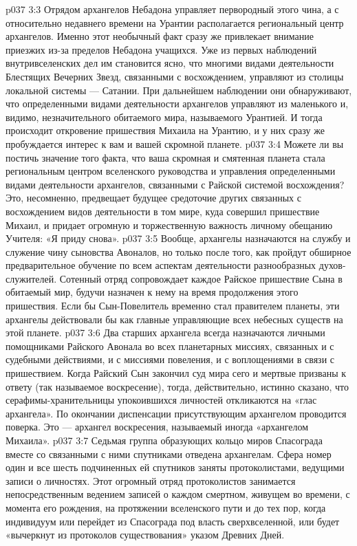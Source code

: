 \vs p037 3:3 \pc Отрядом архангелов Небадона управляет первородный этого чина, а с относительно недавнего времени на Урантии располагается региональный центр архангелов. Именно этот необычный факт сразу же привлекает внимание приезжих из\hyp{}за пределов Небадона учащихся. Уже из первых наблюдений внутривселенских дел им становится ясно, что многими видами деятельности Блестящих Вечерних Звезд, связанными с восхождением, управляют из столицы локальной системы --- Сатании. При дальнейшем наблюдении они обнаруживают, что определенными видами деятельности архангелов управляют из маленького и, видимо, незначительного обитаемого мира, называемого Урантией. И тогда происходит откровение пришествия Михаила на Урантию, и у них сразу же пробуждается интерес к вам и вашей скромной планете.
\vs p037 3:4 Можете ли вы постичь значение того факта, что ваша скромная и смятенная планета стала региональным центром вселенского руководства и управления определенными видами деятельности архангелов, связанными с Райской системой восхождения? Это, несомненно, предвещает будущее средоточие других связанных с восхождением видов деятельности в том мире, куда совершил пришествие Михаил, и придает огромную и торжественную важность личному обещанию Учителя: «Я приду снова».
\vs p037 3:5 \pc Вообще, архангелы назначаются на службу и служение чину сыновства Авоналов, но только после того, как пройдут обширное предварительное обучение по всем аспектам деятельности разнообразных духов\hyp{}служителей. Сотенный отряд сопровождает каждое Райское пришествие Сына в обитаемый мир, будучи назначен к нему на время продолжения этого пришествия. Если бы Сын\hyp{}Повелитель временно стал правителем планеты, эти архангелы действовали бы как главные управляющие всех небесных существ на этой планете.
\vs p037 3:6 Два старших архангела всегда назначаются личными помощниками Райского Авонала во всех планетарных миссиях, связанных и с судебными действиями, и с миссиями повеления, и с воплощениями в связи с пришествием. Когда Райский Сын закончил суд мира сего и мертвые призваны к ответу (так называемое воскресение), тогда, действительно, истинно сказано, что серафимы\hyp{}хранительницы упокоившихся личностей откликаются на «глас архангела». По окончании диспенсации присутствующим архангелом проводится поверка. Это --- архангел воскресения, называемый иногда «архангелом Михаила».
\vs p037 3:7 \pc {} Седьмая группа образующих кольцо миров Спасограда вместе со связанными с ними спутниками отведена архангелам. Сфера номер один и все шесть подчиненных ей спутников заняты протоколистами, ведущими записи о личностях. Этот огромный отряд протоколистов занимается непосредственным ведением записей о каждом смертном, живущем во времени, с момента его рождения, на протяжении вселенского пути и до тех пор, когда индивидуум или перейдет из Спасограда под власть сверхвселенной, или будет «вычеркнут из протоколов существования» указом Древних Дней.
